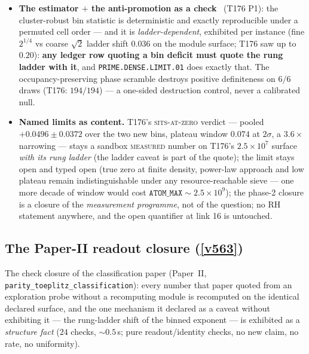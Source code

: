 \documentclass[11pt,a4paper]{article}
\begin{document}
\begin{itemize}[leftmargin=1.5em]
plus statistics, and it is what lets any later probe raise the cap without
re-deriving the chain.
\item \textbf{The estimator $+$ the anti-promotion as a check} \mE\ (T176 P1): the
cluster-robust bin statistic is deterministic and exactly reproducible under a
permuted cell order --- and it is \emph{ladder-dependent}, exhibited per instance
(fine $2^{1/4}$ vs coarse $\sqrt2$ ladder shift $0.036$ on the module surface; T176
saw up to $0.20$): \textbf{any ledger row quoting a bin deficit must quote the rung
ladder with it}, and \texttt{PRIME.DENSE.LIMIT.01} does exactly that. The
occupancy-preserving phase scramble destroys positive definiteness on $6/6$ draws
(T176: $194/194$) --- a one-sided destruction control, never a calibrated null.
\item \textbf{Named limits as content.} T176's \textsc{sits-at-zero} verdict ---
pooled $+0.0496\pm0.0372$ over the two new bins, plateau window $0.074$ at $2\sigma$,
a $3.6\times$ narrowing --- stays a sandbox \textsc{measured} number on T176's
$2.5\times10^{7}$ surface \emph{with its rung ladder} (the ladder caveat is part of
the quote); the limit stays open and typed open (true zero at finite density,
power-law approach and low plateau remain indistinguishable under any
resource-reachable sieve --- one more decade of window would cost
$\mathtt{ATOM\_MAX}\sim2.5\times10^{9}$); the phase-2 closure is a closure of the
\emph{measurement programme}, not of the question; no RH statement anywhere, and the
open quantifier at link 16 is untouched.
\end{itemize}

\subsection{The Paper-II readout closure (\texorpdfstring{\vref{v563}}{v563})}\label{sec:v563}
The check closure of the classification paper (Paper~II,
\texttt{parity\_toeplitz\_classification}): every number that paper quoted from an
exploration probe without a recomputing module is recomputed on the identical
declared surface, and the one mechanism it declared as a caveat without exhibiting
it --- the rung-ladder shift of the binned exponent --- is exhibited as a
\emph{structure fact}  ($24$ checks, ${\sim}0.5$\,s;
pure readout/identity checks, no new claim, no rate, no uniformity).
\end{document}

